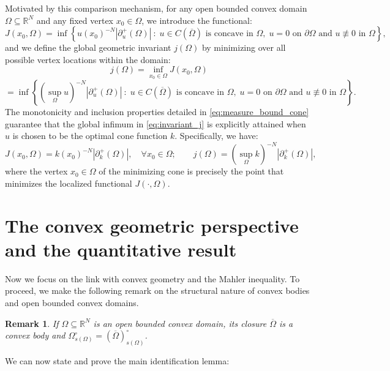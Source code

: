 \documentclass{article}
\newtheorem{remark}[theorem]{Remark}
\numberwithin{equation}{section}
\begin{document}
\noindent Motivated by this comparison mechanism, for any open bounded convex domain $\Omega \subseteq\mathbb{R}^N$ and any fixed vertex $x_0 \in \Omega$, we introduce the functional:
\begin{equation}\label{eq:functional_J}
J(x_0, \Omega) = \inf \left\{ u(x_0)^{-N} |\partial^+_u (\Omega)| \ : \; u \in C({\overline{\Omega}}) \text{ is concave in } \Omega, \; u = 0 \text{ on } \partial \Omega \text{ and }u\not \equiv 0 \text { in }\Omega \right\},
\end{equation}
and we define the global geometric invariant $j(\Omega)$ by minimizing over all possible vertex locations within the domain:
\begin{equation}\label{eq:invariant_j}
j(\Omega) = \inf_{x_0 \in \Omega} J(x_0, \Omega)
\end{equation}
$$= \inf \left\{ (\sup_\Omega u)^{-N} |\partial^+_u(\Omega)| \ : \; u \in C({\overline{\Omega}}) \text{ is concave in } \Omega, \; u = 0 \text{ on } \partial \Omega \text{ and }u\not \equiv 0 \text { in }\Omega \right\}.$$
The monotonicity and inclusion properties detailed in \eqref{eq:measure_bound_cone} guarantee that the global infimum in \eqref{eq:invariant_j} is explicitly attained when $u$ is chosen to be the optimal cone function $k$. Specifically, we have:
\begin{equation}\label{eq:brought1}
J(x_0, \Omega)=k(x_0)^{-N}|\partial^+_k(\Omega)|, \quad \forall x_0 \in \Omega; \qquad j(\Omega) = (\sup_\Omega k)^{-N}|\partial^+_k(\Omega)|,
\end{equation}
where the vertex $x_0 \in \Omega$ of the minimizing cone is precisely the point that minimizes the localized functional $J(\cdot, \Omega)$.

\section{The convex geometric perspective and the quantitative result}
Now we focus on the link with convex geometry and the Mahler inequality. To proceed, we make the following remark on the structural nature of convex bodies and open bounded convex domains.

\begin{remark}
    If $\Omega \subseteq\mathbb{R}^N$ is an open bounded convex domain, its closure $\overline{\Omega}$ is a convex body and $\Omega^\circ_{s(\Omega)}=(\overline{\Omega})^\circ_{s(\Omega)}$.
\end{remark}

\noindent We can now state and prove the main identification lemma:
\end{document}

